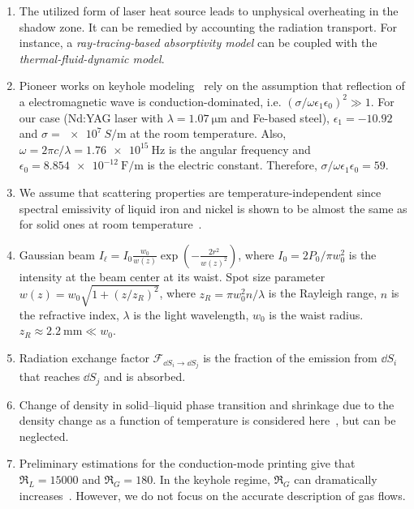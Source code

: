 \documentclass[final]{elsarticle} %
\newcommand{\laser}{\ell} %
\newcommand{\viewfactor}[3]{{#1}_{\dd{S}#2\to\dd{S}#3}}
\begin{document}
\begin{enumerate}
    \item The utilized form of laser heat source leads to unphysical overheating
    in the shadow zone. It can be remedied by accounting the radiation transport.
    For instance, a \emph{ray‐tracing‐based absorptivity model} can be coupled
    with the \emph{thermal-fluid-dynamic model}.
    \item Pioneer works on keyhole modeling~\cite{schulz1987laser, ducharme1994laser, cho2006implementation} rely on the assumption that reflection of a electromagnetic wave is conduction-dominated, i.e. $(\sigma/\omega\epsilon_1\epsilon_0)^2 \gg 1$.
    For our case (Nd:YAG laser with $\lambda=\SI{1.07}{\um}$ and Fe-based steel),
    $\epsilon_1 = -10.92$~\cite{adachi2012handbook} and $\sigma = \SI{e7}{S\per\m}$ at the room temperature.
    Also, $\omega = 2\pi c/\lambda = \SI{1.76e15}{\Hz}$ is the angular frequency
    and $\epsilon_0 = \SI{8.854e-12}{\F\per\m}$ is the electric constant.
    Therefore, $\sigma/\omega\epsilon_1\epsilon_0 = 59$.
    \item We assume that scattering properties are temperature-independent since spectral emissivity of liquid iron and nickel is shown to be almost the same as for solid ones at room temperature~\cite{kobatake2012normal}.
    \item Gaussian beam $I_\laser = I_0\frac{w_0}{w(z)}\exp(-\frac{2r^2}{w(z)^2})$,
    where $I_0 = 2P_0/\pi w_0^2$ is the intensity at the beam center at its waist.
    Spot size parameter $w(z) = w_0\sqrt{1+(z/z_R)^2}$,
    where $z_R = \pi w_0^2 n/\lambda$ is the Rayleigh range,
    $n$ is the refractive index, $\lambda$ is the light wavelength,
    $w_0$ is the waist radius. $z_R\approx \SI{2.2}{\mm}\ll w_0$.
    \item Radiation exchange factor $\viewfactor{\mathcal{F}}{_i}{_j}$ is the fraction of the emission from $\dd{S_i}$
    that reaches $\dd{S_j}$ and is absorbed.
    \item Change of density in solid--liquid phase transition and shrinkage due to the density change as a function of temperature is considered here~\cite{wei2017thermal}, but can be neglected.
    \item Preliminary estimations for the conduction-mode printing give that $\Re_L=15000$
    and $\Re_G=180$. In the keyhole regime, $\Re_G$ can dramatically
    increases~\cite{zhirnov2018evaporation,gusarov2020entrainment,matthews2016denudation}.
    However, we do not focus on the accurate description of gas flows.
\end{enumerate}
\end{document}
